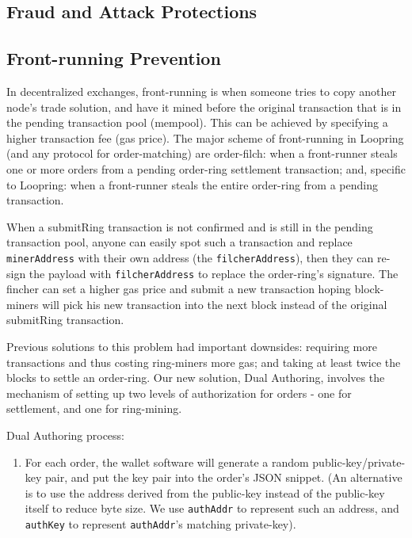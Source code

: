 \documentclass[UTF8,nofonts]{article}
\begin{document}
\begin{multicols}{2}
\begin{enumerate}
\section{Fraud and Attack Protections}

\subsection{Front-running Prevention\label{sec:dual_authoring}}

In decentralized exchanges, front-running is when someone tries to copy another node's trade solution, and have it mined before the original transaction that is in the pending transaction pool (mempool). This can be achieved by specifying a higher transaction fee (gas price). The major scheme of front-running in Loopring (and any protocol for order-matching) are order-filch: when a front-runner steals one or more orders from a pending order-ring settlement transaction; and, specific to Loopring: when a front-runner steals the entire order-ring from a pending transaction.


When a submitRing transaction is not confirmed and is still in the pending transaction pool, anyone can easily spot such a transaction and replace \verb|minerAddress| with their own address (the \verb|filcherAddress|), then they can re-sign the payload with \verb|filcherAddress| to replace the order-ring's signature. The fincher can set a higher gas price and submit a new transaction hoping block-miners will pick his new transaction into the next block instead of the original submitRing transaction.

Previous solutions to this problem had important downsides: requiring more transactions and thus costing ring-miners more gas; and taking at least twice the blocks to settle an order-ring.  Our new solution, Dual Authoring\cite{dualauthor}, involves the mechanism of setting up two levels of authorization for orders - one for settlement, and one for ring-mining.

Dual Authoring process:

\begin{enumerate}

	\item For each order, the wallet software will generate a random public-key/private-key pair, and put the key pair into the order's JSON snippet. (An alternative is to use the address derived from the public-key instead of the public-key itself to reduce byte size. We use \verb|authAddr| to represent such an address, and \verb|authKey| to represent \verb|authAddr|'s matching private-key).


\end{enumerate}
\end{enumerate}
\end{multicols}
\end{document}
